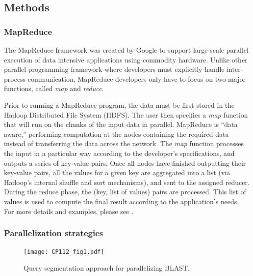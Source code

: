 \documentclass[12pt,\mydriver]{thesis}
\begin{document}
\subsection{Methods}


\subsubsection{MapReduce}
The MapReduce framework was created by Google to support large-scale parallel execution of data intensive applications using commodity hardware\cite{dean2008mapreduce}.
Unlike other parallel programming framework where developers must explicitly handle inter-process communication, MapReduce developers only have to focus on two major functions, called \emph{map} and \emph{reduce}.

Prior to running a MapReduce program, the data must be first stored in the Hadoop Distributed File System (HDFS).
The user then specifies a \emph{map} function that will run on the chunks of the input data in parallel.
MapReduce is ``data aware,'' performing computation at the nodes containing the required data instead of transferring the data across the network.
The \emph{map} function processes the input in a particular way according to the developer’s specifications, and outputs a series of key-value pairs. Once all nodes have finished outputting their key-value pairs, all the values for a given key are aggregated into a list (via Hadoop's internal shuffle and sort mechanisms), and sent to the assigned reducer. During the reduce phase, the (key, list of values) pairs are processed. This list of values is used to compute the final result according to the application’s needs.
For more details and examples, please see \cite{dean2008mapreduce}.

\subsubsection{Parallelization strategies}

\begin{figure}[!htb]\begin{center}
\texttt{[image: CP112\_fig1.pdf]}
\end{center}
\renewcommand{\baselinestretch}{1}
\small\normalsize
\begin{quote}
\caption[Query segmentation approach for parallelizing BLAST]{Query segmentation approach for parallelizing BLAST.}
\label{fig:strategies}
\end{quote}
\end{figure}
\renewcommand{\baselinestretch}{2}
\small\normalsize
\end{document}
